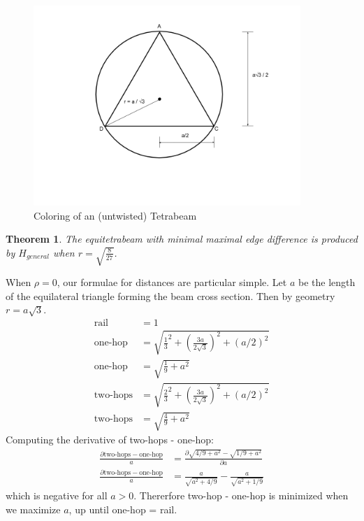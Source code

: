 \documentclass[11pt]{article}
\newtheorem{theorem}{Theorem}
\begin{document}
 \begin{figure}[H]
     \centering
     \includegraphics[width=0.9\textwidth]{figures/EquilateralDiagram.png}
     \caption{Coloring of an (untwisted) Tetrabeam}
 \end{figure}


\begin{theorem}
The equitetrabeam with minimal maximal edge difference is produced by $H_{general}$ when $ r = \sqrt{\frac{8}{27}} $.
  \end{theorem}

When $\rho = 0$, our formulae for distances are particular simple. Let $a$ be the length of the equilateral triangle
forming the beam cross section. Then by geometry $r = a \sqrt{3}$.
\begin{align*}
  \text{rail} &=  1 \\
  \text{one-hop} &= \sqrt{\frac{1}{3}^2 + (\frac{3a}{2\sqrt{3}})^2 + (a/2)^2}\\
\text{one-hop}  &= \sqrt{\frac{1}{9} + a^2} \\
    \text{two-hops} &= \sqrt{\frac{2}{3}^2 + (\frac{3a}{2\sqrt{3}})^2 + (a/2)^2}  \\
\text{two-hops}    &= \sqrt{\frac{4}{9} + a^2}
\end{align*}
Computing the derivative of two-hops - one-hop:
\begin{align*}
 \frac{\partial \text{two-hops} - \text{one-hop}}{a} &= \frac{\partial \sqrt{4/9 + a^2} - \sqrt{1/9 + a^2}}{\partial a} \\
  \frac{\partial \text{two-hops} - \text{one-hop}}{a} &= \frac{a}{\sqrt{a^2 + 4/9}} - \frac{a}{\sqrt{ a^2 + 1/9}} 
\end{align*}
which is negative for all $a> 0$. Thererfore two-hop - one-hop
is minimized when we maximize $a$, up until one-hop = rail.
\end{document}
